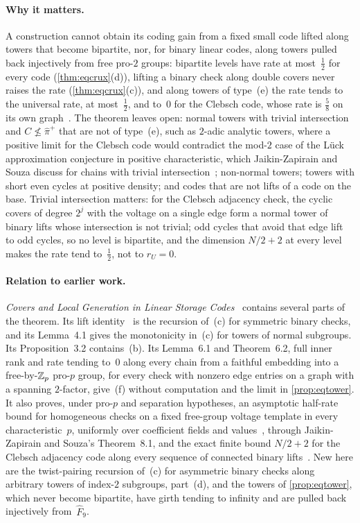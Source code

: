 \paragraph{Why it matters.} A construction cannot obtain its coding gain from a fixed small code lifted along towers that
become bipartite, nor, for binary linear codes, along towers pulled back injectively from free pro-$2$ groups: bipartite levels
have rate at most~$\frac12$ for every code (\cref{thm:eqcrux}(d)), lifting a binary check along double covers never raises the
rate (\cref{thm:eqcrux}(c)), and along towers of type~(e) the rate tends to the universal rate, at most~$\frac12$, and to~$0$
for the Clebsch code, whose rate is $\frac58$ on its own graph~\cite[Corollary~6.11]{FourthPaper2026}. The theorem leaves
open: normal
towers with trivial intersection and $C\not\le\hat\pi^+$ that are not of type~(e), such as $2$-adic analytic towers, where a
positive limit for the Clebsch code would contradict the mod-$2$ case of the Lück approximation conjecture in positive
characteristic, which Jaikin-Zapirain and Souza discuss for chains with trivial intersection~\cite[Section~8]{JaikinSouza2026};
non-normal towers; towers with short even cycles at positive density; and codes that are not lifts of a code on the base.
Trivial intersection matters: for the Clebsch adjacency check, the cyclic covers of degree $2^j$ with the voltage on a single
edge form a normal tower of binary lifts whose intersection is not trivial; odd cycles that avoid that edge lift to odd
cycles, so no level is bipartite, and the dimension $N/2+2$ at every level~\cite[Theorem~9.5]{Covers2026} makes the rate tend
to~$\frac12$, not to $r_U=0$.

\paragraph{Relation to earlier work.} \emph{Covers and Local Generation in Linear Storage Codes}~\cite{Covers2026} contains
several parts of the theorem. Its lift identity~\cite[Lemma~9.1]{Covers2026} is the recursion of~(c) for symmetric binary
checks, and its Lemma~4.1 gives the monotonicity in~(c) for towers of normal subgroups. Its Proposition~3.2 contains~(b). Its Lemma~6.1 and Theorem~6.2, full inner rank and rate tending
to~$0$ along every chain from a faithful embedding into a free-by-$\mathbb{Z}_p$ pro-$p$ group, for every check with nonzero edge
entries on a graph with a spanning $2$-factor, give~(f) without computation and the limit in \cref{prop:eqtower}. It also
proves, under pro-$p$ and separation hypotheses, an asymptotic half-rate bound for homogeneous checks on a fixed free-group
voltage template in every characteristic~$p$, uniformly over coefficient fields and values~\cite[Theorem~4.3]{Covers2026},
through Jaikin-Zapirain and Souza's Theorem~8.1, and the exact finite bound $N/2+2$ for the Clebsch adjacency code along
every sequence of connected binary lifts~\cite[Theorem~9.2]{Covers2026}. New here are the twist-pairing recursion of~(c) for
asymmetric binary checks along arbitrary towers of index-$2$ subgroups, part~(d), and the towers of \cref{prop:eqtower}, which
never become bipartite, have girth tending to infinity and are pulled back injectively from~$\hat F_9$.

